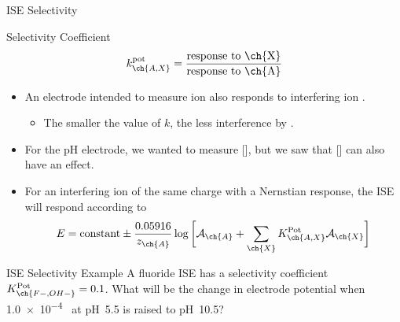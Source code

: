 \documentclass[notes=show]{beamer}
\begin{document}
\begin{frame}{ISE Selectivity}
	\begin{block}{Selectivity Coefficient}
		\begin{equation*}
			k_{\ch{A,X}}^{\text{pot}} = \frac{\text{response to
			\ch{X}}}{\text{response to \ch{A}}}
		\end{equation*}
	\end{block}

	\begin{itemize}
		\item An electrode intended to measure ion  also responds
			to interfering ion .
			\begin{itemize}
				\item The smaller the value of $k$, the less
					interference by .
			\end{itemize}
		\item For the pH electrode, we wanted to measure [], but
			we saw that [] can also have an effect.
		\item For an interfering ion of the \alert{same charge} with a
			Nernstian response, the ISE will respond according to
			\begin{equation*}
				E = \text{constant} \pm
				\frac{0.05916}{z_{\ch{A}}} \log \bigg[
					\mathcal{A}_{\ch{A}} + \sum_{\ch{X}}
					K_{\ch{A,X}}^{\text{Pot}}
					\mathcal{A}_{\ch{X}} \bigg]
			\end{equation*}
	\end{itemize}
\end{frame}

\clearpage

\begin{frame}[t]{ISE Selectivity Example}
	A fluoride ISE has a selectivity coefficient
	$K_{\ch{F- , OH-}}^{\text{Pot}} = 0.1$. What will be the change in
	electrode potential when \SI{1.0e-4}{\Molar}~ at pH~5.5 is raised
	to pH~10.5?

	\vfill

\end{frame}
\end{document}
